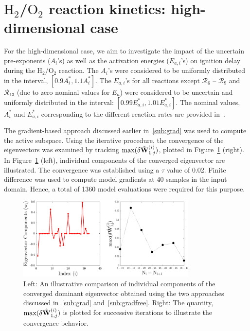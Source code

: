 \section{$\text{H}_2$/$\text{O}_2$ reaction kinetics: high-dimensional case}
\label{sec:app}

For the high-dimensional case, we aim to investigate the impact of the uncertain
pre-exponents ($A_i$'s) as well as the activation energies ($E_{a,i}$'s) on ignition 
delay during the H$_2$/O$_2$ reaction. The $A_i$'s were considered to be uniformly
distributed in the interval, $[0.9A_i^\ast, 1.1A_i^\ast]$. The $E_{a,i}$'s for all
reactions except $\mathcal{R}_6$ -- $\mathcal{R}_9$ and $\mathcal{R}_{13}$ (due to 
zero nominal values for $E_a$)
were considered to be uncertain and uniformly distributed in the interval: 
$[0.99E_{a,i}^\ast, 1.01E_{a,i}^\ast]$. The nominal values, $A_i^\ast$ and $E_{a,i}^\ast$
corresponding to the different reaction rates are provided in~\cite{Yetter:1991}. 

The gradient-based approach discussed earlier in~\ref{sub:grad} was used to compute the
active subspace. Using the iterative procedure, the convergence of the eigenvectors
was examined by tracking $\max(\delta \hat{\mathbf{{W}}}_{1,j}^{(i)})$, plotted in 
Figure~\ref{fig:conv_app} (right). In Figure~\ref{fig:conv_app} (left), individual
components of the converged eigenvector are illustrated. The convergence was established using
a $\tau$ value of 0.02. Finite difference was used to compute model gradients at 40 samples in
the input domain. Hence, a total of 1360 model evaluations were required for this purpose.  
%
\begin{figure}[htbp]
 \begin{center}
  \includegraphics[width=0.8\textwidth]{./Figures/eigv10}
\caption{Left: An illustrative comparison of individual components of the converged dominant eigenvector obtained
using the two approaches discussed in~\ref{sub:grad} and~\ref{sub:gradfree}. Right: The quantity,  
$\max(\delta \hat{\mathbf{{W}}}_{1,j}^{(i)})$
is plotted for successive iterations to illustrate the convergence behavior.}
\label{fig:conv_app}
\end{center}
\end{figure}
%
 
